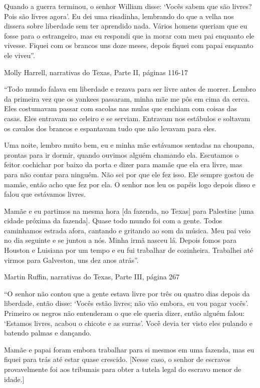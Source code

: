 Quando a guerra terminou, o senhor William disse: `Vocês sabem que são
livres? Pois são livres agora'. Eu dei uma risadinha, lembrando do que a
velha nos dissera sobre liberdade sem ter aprendido nada. Vários homens
queriam que eu fosse para o estrangeiro, mas eu respondi que ia morar
com meu pai enquanto ele vivesse. Fiquei com os brancos uns doze meses,
depois fiquei com papai enquanto ele viveu''.

Molly Harrell, narrativas do Texas, Parte II, páginas 116-17

``Todo mundo falava em liberdade e rezava para ser livre antes de
morrer. Lembro da primeira vez que os yankees passaram, minha mãe me pôs
em cima da cerca. Eles costumavam passar com sacolas nas mulas que
enchiam com coisas das casas. Eles entravam no celeiro e se serviam.
Entravam nos estábulos e soltavam os cavalos dos brancos e espantavam
tudo que não levavam para eles.

Uma noite, lembro muito bem, eu e minha mãe estávamos sentadas na
choupana, prontas para ir dormir, quando ouvimos alguém chamando ela.
Escutamos o feitor cochichar por baixo da porta e dizer para mamãe que
ela era livre, mas para não contar para ninguém. Não sei por que ele fez
isso. Ele sempre gostou de mamãe, então acho que fez por ela. O senhor
nos leu os papéis logo depois disso e falou que estávamos livres.

Mamãe e eu partimos na mesma hora {[}da fazenda, no Texas{]} para
Palestine {[}uma cidade próxima da fazenda{]}. Quase todo mundo foi com
a gente. Todos caminhamos estrada afora, cantando e gritando ao som da
música. Meu pai veio no dia seguinte e se juntou a nós. Minha irmã
nasceu lá. Depois fomos para Houston e Luisiana por um tempo e eu fui
trabalhar de cozinheira. Trabalhei até virmos para Galveston, uns dez
anos atrás''.

Martin Ruffin, narrativas do Texas, Parte III, página 267

``O senhor não contou que a gente estava livre por três ou quatro dias
depois da liberdade, então disse: `Vocês estão livres; não vão embora,
eu vou pagar vocês'. Primeiro os negros não entenderam o que ele queria
dizer, então alguém falou: `Estamos livres, acabou o chicote e as
surras'. Você devia ter visto eles pulando e batendo palmas e dançando.

Mamãe e papai foram embora trabalhar para si mesmos em uma fazenda, mas
eu fiquei para trás até estar quase crescido. {[}Nesse caso, o senhor de
escravos provavelmente foi aos tribunais para obter a tutela legal do
escravo menor de idade.{]}

